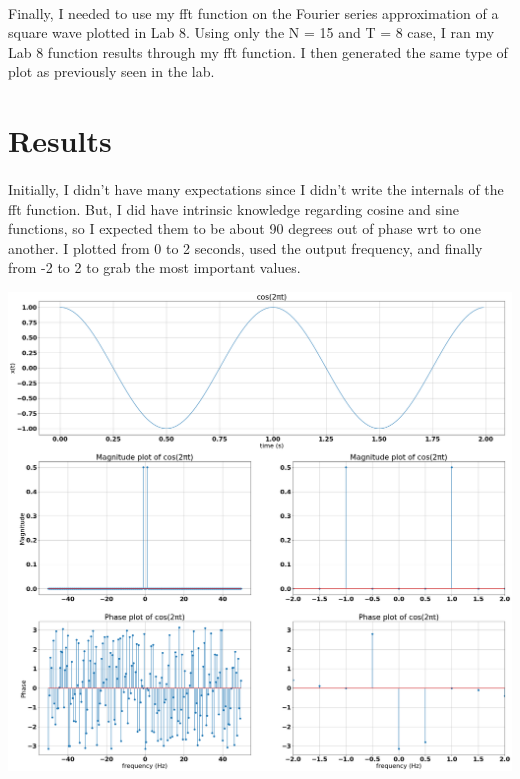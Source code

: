 \documentclass[12pt]{report}
\begin{document}
    \paragraph{} Finally, I needed to use my fft function on the Fourier series approximation of a square wave plotted in Lab 8. Using only the N = 15 and T = 8 case, I ran my Lab 8 function results through my fft function. I then generated the same type of plot as previously seen in the lab.   
    
\section{Results}

    
    \paragraph{} Initially, I didn't have many expectations since I didn't write the internals of the fft function. But, I did have intrinsic knowledge regarding cosine and sine functions, so I expected them to be about 90 degrees out of phase wrt to one another. I plotted from 0 to 2 seconds, used the output frequency, and finally from -2 to 2 to grab the most important values.    
    
    \includegraphics[scale=0.25]{Figure 2022-03-22 205111 (0).png}
    
\end{document}
